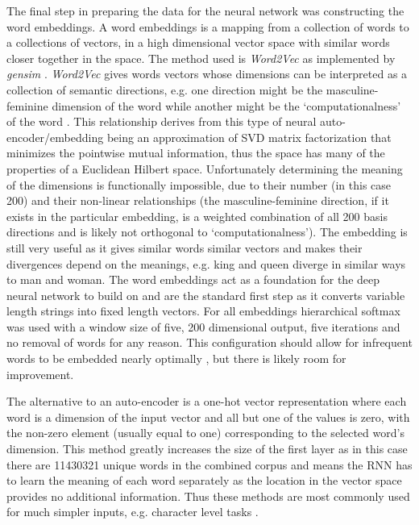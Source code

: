 \documentclass[12pt, a4paper]{article}
\begin{document}
The final step in preparing the data for the neural network was constructing the word embeddings. A word embeddings is a mapping from a collection of words to a collections of vectors, in a high dimensional vector space with similar words closer together in the space\citep{wordembeding}. The method used is \textit{Word2Vec} \citep{mikolov2013efficient} as implemented by \textit{gensim} \citep{rehurek_lrec}. \textit{Word2Vec} gives words vectors whose dimensions can be interpreted as a collection of semantic directions, e.g. one direction might be the masculine-feminine dimension of the word while another might be the `computationalness' of the word \citep{bolukbasi2016man}. This relationship derives from this type of neural auto-encoder/embedding being an approximation of SVD matrix factorization \citep{levy2014neural} that minimizes the pointwise mutual information, thus the space has many of the properties of a Euclidean Hilbert space. Unfortunately determining the meaning of the dimensions is functionally impossible, due to their number (in this case 200) and their non-linear relationships (the masculine-feminine direction, if it exists in the particular embedding, is a weighted combination of all 200 basis directions and is likely not orthogonal to `computationalness'). The embedding is still very useful as it gives similar words similar vectors and makes their divergences depend on the meanings, e.g. king and queen diverge in similar ways to man and woman. The word embeddings act as a foundation for the deep neural network to build on and are the standard first step \citep{deep_learning_chapter12} as it converts variable length strings into fixed length vectors. For all embeddings hierarchical softmax was used with a window size of five, 200 dimensional output, five iterations and no removal of words for any reason. This configuration should allow for infrequent words to be embedded nearly optimally  \citep{rehurek_lrec}, but there is likely room for improvement.

The alternative to an auto-encoder is a one-hot vector representation where each word is a dimension of the input vector and all but one of the values is zero, with the non-zero element (usually equal to one) corresponding to the selected word's dimension. This method greatly increases the size of the first layer as in this case there are \num{11430321} unique words in the combined corpus and means the RNN has to learn the meaning of each word separately as the location in the vector space provides no additional information. Thus these methods are most commonly used for much simpler inputs, e.g. character level tasks \citep{rodriguez1999recurrent}.
 
\end{document}
